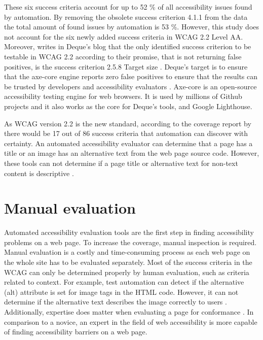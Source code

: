 These six success criteria account for up to 52 \% of all accessibility issues found by automation. By removing the obsolete success criterion 4.1.1 from the data the total amount of found issues by automation is 53 \%. However, this study does not account for the six newly added success criteria in WCAG 2.2 Level AA. Moreover, \textcite{dequeaxe4_5} writes in Deque's blog that the only identified success criterion to be testable in WCAG 2.2 according to their promise, that is not returning false positives, is the success criterion 2.5.8 Target size \citep{dequeaxe4_5}. Deque's target is to ensure that the axe-core engine reports zero false positives to ensure that the results can be trusted by developers and accessibility evaluators \citep{dequecoverage}. Axe-core is an open-source accessibility testing engine for web browsers. It is used by millions of Github projects and it also works as the core for Deque's tools, and Google Lighthouse. 

As WCAG version 2.2 is the new standard, according to the coverage report by \textcite{dequecoverage} there would be 17 out of 86 success criteria that automation can discover with certainty. An automated accessibility evaluator can determine that a page has a title or an image has an alternative text from the web page source code. However, these tools can not determine if a page title or alternative text for non-text content is descriptive \citep{wcag_checklist}.

\section{Manual evaluation}

Automated accessibility evaluation tools are the first step in finding accessibility problems on a web page. To increase the coverage, manual inspection is required. Manual evaluation is a costly and time-consuming process as each web page on the whole site has to be evaluated separately. Most of the success criteria in the WCAG can only be determined properly by human evaluation, such as criteria related to context. For example, test automation can detect if the alternative (alt) attribute is set for image tags in the HTML code. However, it can not determine if the alternative text describes the image correctly to users \citep{comparison_10.1145/3371300.3383346}. Additionally, expertise does matter when evaluating a page for conformance \citep{10.1145/1878803.1878813_testability_expertise, comparative_accessibility_methods}. In comparison to a novice, an expert in the field of web accessibility is more capable of finding accessibility barriers on a web page.

